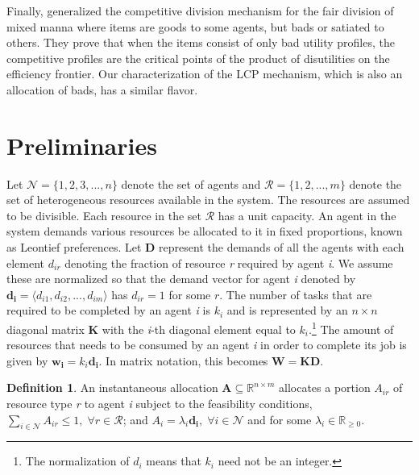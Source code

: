 \documentclass[letterpaper]{article} %
\theoremstyle{definition}
\newtheorem{definition}{Definition}
\begin{document}
Finally, \citeauthor{bogomolnaia2017competitive}  generalized the competitive division mechanism for the fair division of mixed manna where items are goods to some agents, but bads or satiated to others. They prove that when the items consist of only bad utility profiles, the competitive profiles are the critical points of the product of disutilities on the efficiency frontier. Our characterization of the LCP mechanism, which is also an allocation of bads, has a similar flavor.

\section{Preliminaries}   \label{prelim}

Let $\mathcal{N} = \{1,2,3,...,n\}$ denote the set of agents and $\mathcal{R} = \{1, 2, ..., m\}$ denote the set of heterogeneous resources available in the system. The resources are assumed to be divisible. Each resource in the set $\mathcal{R}$ has a unit capacity. An agent in the system demands various resources be allocated to it in fixed proportions, known as Leontief preferences. Let $\mathbf{D}$ represent the demands of all the agents with each element $d_{ir}$ denoting the fraction of resource \textit{r} required by agent \textit{i}. We assume these are normalized so that the demand vector for agent \textit{i} denoted by $\mathbf{d_{i}} =  \langle d_{i1}, d_{i2}, ..., d_{im} \rangle$ has $d_{ir} = 1$ for some $r$. The number of tasks that are required to be completed by an agent \textit{i} is $k_{i}$ and is represented by an $n \times n$ diagonal matrix $\mathbf{K}$ with the \textit{i}-th diagonal element equal to $k_{i}$.\footnote{The normalization of $d_i$ means that $k_i$ need not be an integer.} The amount of resources that needs to be consumed by an agent \textit{i} in order to complete its job is given by $\mathbf{w_{i}} = k_{i}\mathbf{d_{i}}$. In matrix notation, this becomes $\mathbf{W} = \mathbf{K} \mathbf{D}$. 

\begin{definition}
An instantaneous allocation $\mathbf{A}
\subseteq \mathbb{R}^{n \times m}$ allocates a portion $A_{ir}$ of resource type \textit{r} to agent \textit{i} subject to the feasibility conditions, $ \displaystyle \sum_{i \in \mathcal{N}} A_{ir} \leq 1, \; \forall r \in \mathcal{R}$; and $A_{i} = \lambda_{i} \mathbf{d_{i}}, \; \forall i \in \mathcal{N} $ and for some $\lambda_{i} \in \mathbb{R}_{\geq 0}$.
\end{definition}
\end{document}
